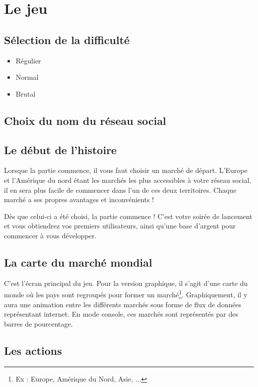 \section{Le jeu}

\subsection{Sélection de la difficulté}
\begin{itemize}
    \item Régulier
    \item Normal
    \item Brutal
\end{itemize}
\subsection{Choix du nom du réseau social}
\subsection{Le début de l'histoire}
Lorsque la partie commence, il vous faut choisir un marché de départ. L'Europe et l'Amérique du nord étant les marchés les plus accessibles à votre réseau social, il en sera plus facile de commencer dans l'un de ces deux territoires. Chaque marché a ses propres avantages et inconvénients !

Dès que celui-ci a été choisi, la partie commence ! C'est votre soirée de lancement et vous obtiendrez vos premiers utilisateurs, ainsi qu'une base d'argent pour commencer à vous développer.

\subsection{La carte du marché mondial}
C'est l'écran principal du jeu. Pour la version graphique, il s'agit d'une carte du monde où les pays sont regroupés pour former un marché\footnote{Ex : Europe, Amérique du Nord, Asie, ...}. Graphiquement, il y aura une animation entre les différents marchés sous forme de flux de données représentant internet. En mode console, ces marchés sont représentés par des barres de pourcentage.


\subsection{Les actions}
